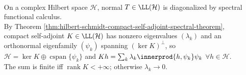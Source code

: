 \begin{perspective} \label{per:hilbert-operator-spectral-theory} \\
On a complex Hilbert space $\mathcal H$, normal $T\in\LL(\mathcal H)$ is diagonalized by spectral functional calculus.\\
By Theorem \ref{thm:hilbert-schmidt-compact-self-adjoint-spectral-theorem}, compact self-adjoint $K\in\LL(\mathcal H)$ has nonzero eigenvalues $(\lambda_k)$ and an orthonormal eigenfamily $(\psi_k)$ spanning $(\ker K)^\perp$, so $\mathcal H=\ker K\oplus\operatorname{cspan}\{\psi_k\}$ and $Kh=\sum_k\lambda_k\innerprod{h,\psi_k}\psi_k$ $\forall h\in\mathcal H$.\\
The sum is finite iff $\operatorname{rank}K<+\infty$; otherwise $\lambda_k\to0$.
\end{perspective}
